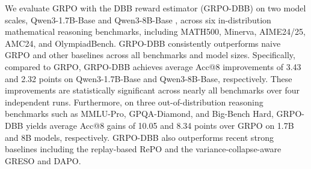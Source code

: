 We evaluate GRPO with the DBB reward estimator (GRPO-DBB) on two model scales, Qwen3-1.7B-Base and Qwen3-8B-Base \cite{yang2025qwen3technicalreport}, across six in-distribution mathematical reasoning benchmarks, including MATH500, Minerva, AIME24/25, AMC24, and OlympiadBench.
GRPO-DBB consistently outperforms naive GRPO and other baselines across all benchmarks and model sizes.
Specifically, compared to GRPO, GRPO-DBB achieves average Acc@8 improvements of 3.43 and 2.32 points on Qwen3-1.7B-Base and Qwen3-8B-Base, respectively.
These improvements are statistically significant across nearly all benchmarks over four independent runs.
Furthermore, on three out-of-distribution reasoning benchmarks such as MMLU-Pro, GPQA-Diamond, and Big-Bench Hard, GRPO-DBB yields average Acc@8 gains of 10.05 and 8.34 points over GRPO on 1.7B and 8B models, respectively.
GRPO-DBB also outperforms recent strong baselines including the replay-based RePO and the variance-collapse-aware GRESO and DAPO.
